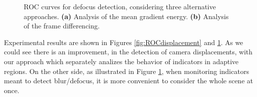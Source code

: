 \documentclass{llncs}
\begin{document}
\begin{figure}[htb]
\centering
{}
\caption{ROC curves for defocus detection, considering three alternative approaches. \textbf{(a)} Analysis of the mean gradient energy. \textbf{(b)} Analysis of the frame differencing.}
\label{fig:ROCdisplacement}
\label{fig:ROCdefocus}
\end{figure}
Experimental results are shown in Figures \ref{fig:ROCdisplacement} and \ref{fig:ROCdefocus}.
As we could see there is an improvement, in the detection of camera displacements, with our approach which separately analizes the behavior of indicators in adaptive regions.
On the other side, as illustrated in Figure \ref{fig:ROCdefocus}, when monitoring indicators meant to detect blur/defocus, it is more convenient to consider the whole scene at once.
\end{document}
